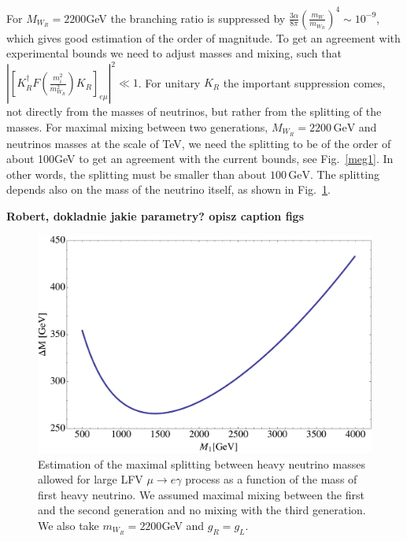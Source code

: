 \documentclass[twocolumn,superscriptaddress,showpacs,prl,nofootinbib,floatfix]{revtex4}
\begin{document}
For $M_{W_{R}}=2200$GeV the branching ratio is suppressed by $\frac{3\alpha}{8\pi}\left(\frac{m_{W}}{m_{W_{R}}}\right)^{4}\sim10^{-9}$,
which gives good estimation of the order of magnitude. To get an agreement
with experimental bounds we need to adjust masses and mixing, such
that $\left|\left[K_{R}^{\dagger}F\left(\frac{m_{i}^{2}}{m_{W_{R}}^{2}}\right)K_{R}\right]_{e\mu}\right|^{2}\ll1$.
For unitary $K_{R}$ the important suppression comes, not directly
from the masses of neutrinos, but rather from the splitting of the
masses. For maximal mixing between two generations, $M_{W_{R}}=2200\,\mathrm{GeV}$
and neutrinos masses at the scale of TeV, we need the splitting to
be of the order of about 100GeV to get an agreement with the current
bounds, see Fig.~\ref{meg1}. In other words, the splitting must be smaller than about $100\,\mathrm{GeV}$.
The splitting depends also on the mass of the neutrino itself, as shown in Fig.~\ref{meg2}.

  {\bf Robert, dokladnie jakie parametry? opisz caption figs}
  
  \begin{figure}[h!]
  \begin{center}
  \includegraphics[width=\columnwidth]{Plot2}
  \caption{Estimation of the maximal splitting between heavy neutrino
    masses allowed for large LFV $\mu \to e \gamma$ process as a
    function of the mass of first heavy neutrino. We assumed maximal
    mixing between the first and the second generation and no mixing
    with the third generation.  We also take $m_{W_R}=2200$GeV and $g_R=g_L$.
  }
  \end{center}\label{meg2}
  \end{figure}
  
\end{document}
